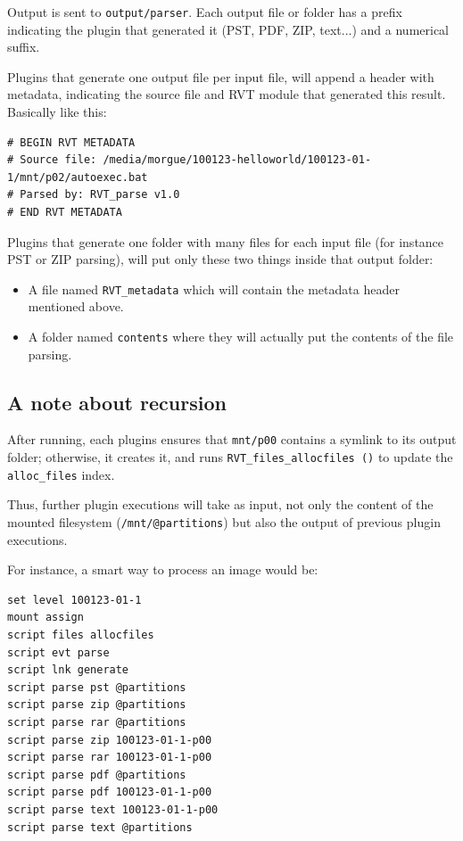 \documentclass[a4paper,11pt,oneside]{report}
\begin{document}
Output is sent to \texttt{output/parser}. Each output file or folder has a prefix indicating the plugin that generated it (PST, PDF, ZIP, text...) and a numerical suffix.

Plugins that generate one output file per input file, will append a header with metadata, indicating the source file and RVT module that generated this result. Basically like this:
\begin{verbatim}
# BEGIN RVT METADATA
# Source file: /media/morgue/100123-helloworld/100123-01-1/mnt/p02/autoexec.bat
# Parsed by: RVT_parse v1.0
# END RVT METADATA
\end{verbatim}

Plugins that generate one folder with many files for each input file (for instance PST or ZIP parsing), will put only these two things inside that output folder:
\begin{itemize}
	\item A file named \texttt{RVT\_metadata} which will contain the metadata header mentioned above.
	\item A folder named \texttt{contents} where they will actually put the contents of the file parsing.
\end{itemize}



\subsection{A note about recursion}

After running, each plugins ensures that \texttt{mnt/p00} contains a symlink to its output folder; otherwise, it creates it, and runs \texttt{RVT\_files\_allocfiles ()} to update the \texttt{alloc\_files} index.

Thus, further plugin executions will take as input, not only the content of the mounted filesystem (\texttt{/mnt/@partitions}) but also the output of previous plugin executions.

For instance, a smart way to process an image would be:
\begin{verbatim}
set level 100123-01-1
mount assign
script files allocfiles
script evt parse
script lnk generate
script parse pst @partitions
script parse zip @partitions
script parse rar @partitions
script parse zip 100123-01-1-p00
script parse rar 100123-01-1-p00
script parse pdf @partitions
script parse pdf 100123-01-1-p00
script parse text 100123-01-1-p00
script parse text @partitions
\end{verbatim}
\end{document}

